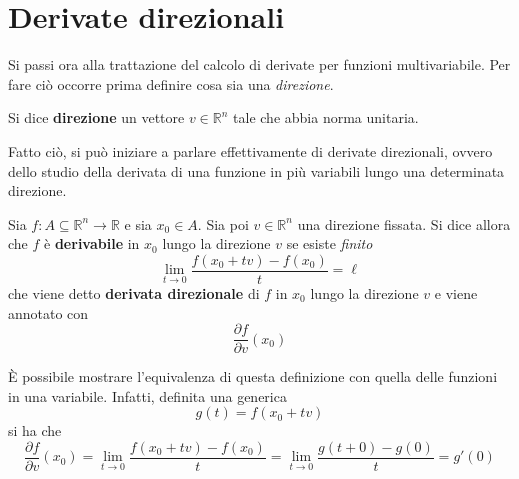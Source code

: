\section{Derivate direzionali}
Si passi ora alla trattazione del calcolo di derivate per funzioni multivariabile. Per fare ciò occorre prima definire cosa sia una \textit{direzione}.
\begin{definition} \label{Def: Direzione}
    Si dice \textbf{direzione} un vettore $v \in \mathbb{R}^n$ tale che abbia norma unitaria. 
\end{definition}
Fatto ciò, si può iniziare a parlare effettivamente di derivate direzionali, ovvero dello studio della derivata di una funzione in più variabili lungo una determinata direzione.
\begin{definition}
    Sia $f: A \subseteq \mathbb{R}^n \to \mathbb{R}$ e sia $x_0 \in A$. Sia poi $v \in \mathbb{R}^n$ una direzione fissata.
    Si dice allora che $f$ è \textbf{derivabile} in $x_0$ lungo la direzione $v$ se esiste \textit{finito}
    \begin{equation}
        \lim_{t \to 0}{\frac{f(x_0+tv)-f(x_0)}{t}}= \ell
    \end{equation}
    che viene detto \textbf{derivata direzionale} di $f$ in $x_0$ lungo la direzione $v$ e viene annotato con 
    \begin{equation}
        \frac{\partial{f}}{\partial{v}}(x_0)
    \end{equation}
    \end{definition}
\begin{oss}
    È possibile mostrare l'equivalenza di questa definizione con quella delle funzioni in una variabile. Infatti, definita una generica
    \begin{equation}
        g(t)=f(x_0+tv)
    \end{equation}
    si ha che 
    \begin{equation}
        \frac{\partial{f}}{\partial{v}}(x_0) = \lim_{t \to 0}{\frac{f(x_0+tv)-f(x_0)}{t}} = \lim_{t \to 0}{\frac{g(t+0)-g(0)}{t}}=g'(0)
    \end{equation}
\end{oss}
